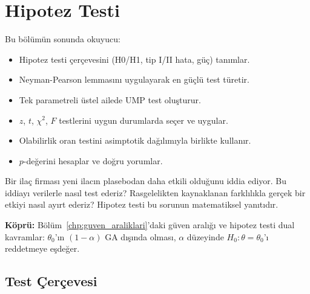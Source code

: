 \chapter{Hipotez Testi}
\label{chp:hipotez_testi}


\begin{kazanimlar}
Bu bölümün sonunda okuyucu:
\begin{itemize}
  \item Hipotez testi çerçevesini (H0/H1, tip I/II hata, güç) tanımlar.
  \item Neyman-Pearson lemmasını uygulayarak en güçlü test türetir.
  \item Tek parametreli üstel ailede UMP test oluşturur.
  \item $z$, $t$, $\chi^2$, $F$ testlerini uygun durumlarda seçer ve uygular.
  \item Olabilirlik oran testini asimptotik dağılımıyla birlikte kullanır.
  \item $p$-değerini hesaplar ve doğru yorumlar.
\end{itemize}
\end{kazanimlar}

\begin{motivasyon}
Bir ilaç firması yeni ilacın plasebodan daha etkili olduğunu iddia ediyor. Bu iddiayı verilerle nasıl test ederiz? Rasgelelikten kaynaklanan farklılıkla gerçek bir etkiyi nasıl ayırt ederiz? Hipotez testi bu sorunun matematiksel yanıtıdır.

\medskip
\noindent\textbf{Köprü:} Bölüm~\ref{chp:guven_araliklari}'daki güven aralığı ve hipotez testi dual kavramlar: $\theta_0$'ın $(1-\alpha)$ GA dışında olması, $\alpha$ düzeyinde $H_0:\theta=\theta_0$'ı reddetmeye eşdeğer.
\end{motivasyon}

\section{Test Çerçevesi}
\label{sec:test_cercevesi}

